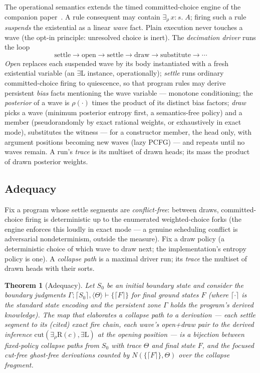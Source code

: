 \documentclass[11pt]{article}
\newcommand{\laxb}[1]{\{#1\}}                   %
\newcommand{\enc}[1]{\lceil #1 \rceil}          %
\newcommand{\erho}[2]{\exists_{\rho}\, #1{:}#2.\;} %
\newcommand{\trz}[1]{\langle #1\rangle}            %
\newcommand{\Tr}{\Theta}                           %
\newtheorem{theorem}{Theorem}[section]
\theoremstyle{definition}
\theoremstyle{remark}
\begin{document}
The operational semantics extends the timed committed-choice engine of
the companion paper~\cite{TillPaper}.  A rule consequent may contain
$\erho{x}{s}A$; firing such a rule \emph{suspends} the existential as a
linear \emph{wave} fact.  Plain execution never touches a wave (the
opt-in principle: unresolved choice is inert).  The \emph{decimation
driver} runs the loop
\[
  \text{settle} \to \text{open} \to \text{settle} \to \text{draw} \to
  \text{substitute} \to \cdots
\]
\emph{Open} replaces each suspended wave by its body instantiated with
a fresh existential variable (an $\exists$L instance, operationally);
\emph{settle} runs ordinary committed-choice firing to quiescence, so
that program rules may derive persistent \emph{bias} facts mentioning
the wave variable --- monotone conditioning; the \emph{posterior} of a
wave is $\rho(\cdot)$ times the product of its distinct bias factors;
\emph{draw} picks a wave (minimum posterior entropy first, a
semantics-free policy) and a member (pseudorandomly by exact rational
weights, or exhaustively in exact mode), substitutes the witness ---
for a constructor member, the head only, with argument positions
becoming new waves (lazy PCFG) --- and repeats until no waves remain.
A run's \emph{trace} is its multiset of drawn heads; its mass the
product of drawn posterior weights.

\subsection{Adequacy}

Fix a program whose settle segments are \emph{conflict-free}: between
draws, committed-choice firing is deterministic up to the enumerated
weighted-choice forks (the engine enforces this loudly in exact mode
--- a genuine scheduling conflict is adversarial nondeterminism,
outside the measure).  Fix a draw policy (a deterministic choice of
which wave to draw next; the implementation's entropy policy is one).
A \emph{collapse path} is a maximal driver run; its \emph{trace} the
multiset of drawn heads with their sorts.

\begin{theorem}[Adequacy]\label{thm:adequacy}
Let $S_0$ be an initial boundary state and consider the boundary
judgments $\Gamma;\enc{S_0},\trz{\Tr} \vdash \laxb{\enc{F}}$ for final
ground states $F$ (where $\enc{\cdot}$ is the standard state encoding
and the persistent zone $\Gamma$ holds the program's derived
knowledge).  The map that elaborates a collapse path to a derivation
--- each settle segment to its (cited) exact fire chain, each wave's
open+draw pair to the derived inference
$\mathrm{cut}(\exists_\rho\text{R}(c), \exists\text{L})$ at the
opening position --- is a bijection between fixed-policy collapse
paths from $S_0$ with trace $\Tr$ and final state $F$, and the focused
cut-free ghost-free derivations counted by $N(\laxb{\enc F},\Tr)$
over the collapse fragment.
\end{theorem}
\end{document}

